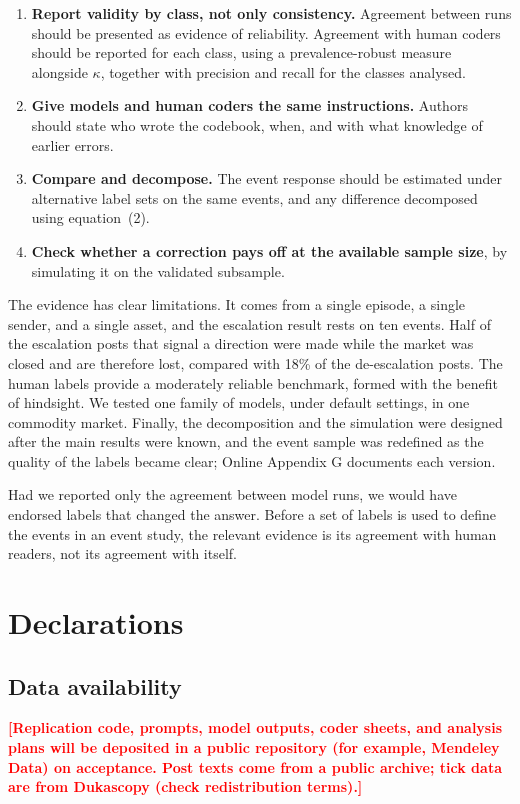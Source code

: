 \documentclass[12pt]{article}
\newcommand{\chk}[1]{\textcolor{red}{\textbf{[#1]}}}
\begin{document}
\begin{enumerate}
\item \textbf{Report validity by class, not only consistency.} Agreement between runs should be presented as evidence of reliability. Agreement with human coders should be reported for each class, using a prevalence-robust measure alongside $\kappa$, together with precision and recall for the classes analysed.
\item \textbf{Give models and human coders the same instructions.} Authors should state who wrote the codebook, when, and with what knowledge of earlier errors.
\item \textbf{Compare and decompose.} The event response should be estimated under alternative label sets on the same events, and any difference decomposed using equation~(2).
\item \textbf{Check whether a correction pays off at the available sample size}, by simulating it on the validated subsample.
\end{enumerate}

The evidence has clear limitations. It comes from a single episode, a single sender, and a single asset, and the escalation result rests on ten events. Half of the escalation posts that signal a direction were made while the market was closed and are therefore lost, compared with 18\% of the de-escalation posts. The human labels provide a moderately reliable benchmark, formed with the benefit of hindsight. We tested one family of models, under default settings, in one commodity market. Finally, the decomposition and the simulation were designed after the main results were known, and the event sample was redefined as the quality of the labels became clear; Online Appendix G documents each version.

Had we reported only the agreement between model runs, we would have endorsed labels that changed the answer. Before a set of labels is used to define the events in an event study, the relevant evidence is its agreement with human readers, not its agreement with itself.

\clearpage
\section*{Declarations}

\subsection*{Data availability}
\chk{Replication code, prompts, model outputs, coder sheets, and analysis plans will be deposited in a public repository (for example, Mendeley Data) on acceptance. Post texts come from a public archive; tick data are from Dukascopy (check redistribution terms).}
\end{document}
